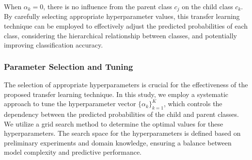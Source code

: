 \documentclass[final,1p,times,authoryear]{elsarticle}
\begin{document}
When $\alpha_k=0 $, there is no influence from the parent class $c_j$ on the child class $c_k$.  By carefully selecting appropriate hyperparameter values, this transfer learning technique can be employed to effectively adjust the predicted probabilities of each class, considering the hierarchical relationship between classes, and potentially improving classification accuracy.

\subsubsection{Parameter Selection and Tuning}
The selection of appropriate hyperparameters is crucial for the effectiveness of the proposed transfer learning technique. In this study, we employ a systematic approach to tune the hyperparameter vector ${\{\alpha_k \}}_{k=1}^K$, which controls the dependency between the predicted probabilities of the child and parent classes. We utilize a grid search method to determine the optimal values for these hyperparameters. The search space for the hyperparameters is defined based on preliminary experiments and domain knowledge, ensuring a balance between model complexity and predictive performance.
\end{document}
